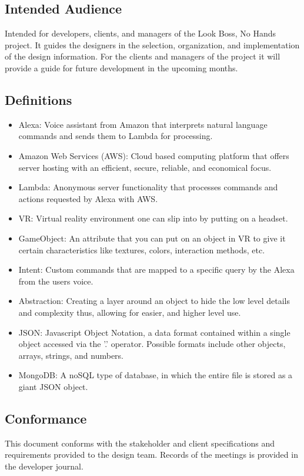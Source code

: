 \documentclass[onecolumn, draftclsnofoot,10pt, compsoc]{IEEEtran}
\begin{document}
    \subsection{Intended Audience}
        Intended for developers, clients, and managers of the Look Boss, No Hands project. It guides the designers in the selection, organization, and implementation of the design information. For the clients and managers of the project it will provide a guide for future development in the upcoming months.
        
    \subsection{Definitions}
        \begin{itemize}
            \item Alexa: Voice assistant from Amazon that interprets natural language commands and sends them to Lambda for processing. 
            \item Amazon Web Services (AWS): Cloud based computing platform that offers server hosting with an efficient, secure, reliable, and economical focus. 
            \item Lambda: Anonymous server functionality that processes commands and actions requested by Alexa with AWS. 
            \item VR: Virtual reality environment one can slip into by putting on a headset. 
            \item GameObject: An attribute that you can put on an object in VR to give it certain characteristics like textures, colors, interaction methods, etc. 
            \item Intent: Custom commands that are mapped to a specific query by the Alexa from the users voice.
            \item Abstraction: Creating a layer around an object to hide the low level details and complexity thus, allowing for easier, and higher level use. 
            \item JSON: Javascript Object Notation, a data format contained within a single object accessed via the {'}.{'} operator. Possible formats include other objects, arrays, strings, and numbers. 
            \item MongoDB: A noSQL type of database, in which the entire file is stored as a giant JSON object. 
        \end{itemize}
    \subsection{Conformance}
        This document conforms with the stakeholder and client specifications and requirements provided to the design team. Records of the meetings is provided in the developer journal.
        
\end{document}
